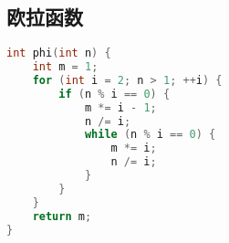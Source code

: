 \subsection{欧拉函数}
    \begin{lstlisting}[language=c++]
int phi(int n) {
	int m = 1;
	for (int i = 2; n > 1; ++i) {
		if (n % i == 0) {
			m *= i - 1;
			n /= i;
			while (n % i == 0) {
				m *= i;
				n /= i;
			}
		}
	}
	return m;
}
    \end{lstlisting}
